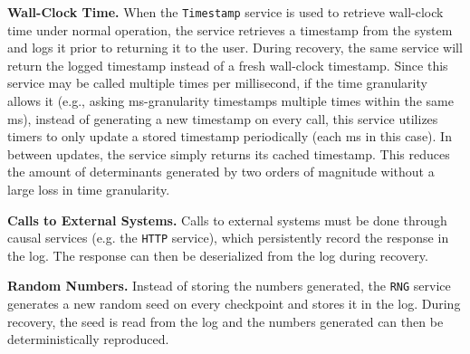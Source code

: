\documentclass[sigconf]{acmart}
\newcommand{\para}[1]{\vspace{1mm}\noindent\textbf{#1.}}
\begin{document}
\para{Wall-Clock Time} When the \texttt{Timestamp} service is used to retrieve wall-clock time under normal operation, the service retrieves a timestamp from the system and logs it prior to returning it to the user. During recovery, the same service will return the logged timestamp instead of a fresh wall-clock timestamp. Since this service may be called multiple times per millisecond, if the time granularity allows it (e.g., asking ms-granularity timestamps multiple times within the same ms), instead of generating a new timestamp on every call, this service utilizes timers to only update a stored timestamp periodically (each ms in this case). In between updates, the service simply returns its cached timestamp. This reduces the amount of determinants generated by two orders of magnitude without a large loss in time granularity.

\para{Calls to External Systems} Calls to external systems must be done through causal services (e.g. the \texttt{HTTP} service), which persistently record the response in the log. The response can then be deserialized from the log during recovery.

\para{Random Numbers} Instead of storing the numbers generated, the \texttt{RNG} service generates a new random seed on every checkpoint and stores it in the log. During recovery, the seed is read from the log and the numbers generated can then be deterministically reproduced.


\end{document}
